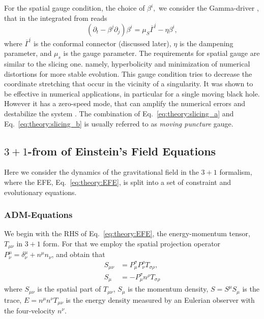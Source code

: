 For the spatial gauge condition, the choice of $\beta^i,$ we consider the Gamma-driver 
\citep{Alcubierre:2002kk,vanMeter:2006vi}, that in the integrated from reads 
%
\begin{equation}
    (\partial_t - \beta^j\partial_j)\beta^i = \mu_S\overline{\Gamma}^i - \eta\beta^i,
    \label{eq:theory:slicing_b}
\end{equation}
%
where $\overline{\Gamma}^i$ is the conformal connector (discussed later), $\eta$ is the 
dampening parameter, and $\mu_s$ is the gauge parameter.
The requirements for spatial gauge are similar to the slicing one. 
namely, hyperbolicity and minimization of numerical distortions for more stable evolution. 
This gauge condition tries to decrease the coordinate stretching that occur in the 
vicinity of a singularity. It was shown to be effective in numerical applications, 
in particular for a single moving black hole. However it has a zero-speed mode, 
that can amplify the numerical errors and destabilize the system \citep{vanMeter:2006vi}.
%
The combination of Eq.~\eqref{eq:theory:slicing_a} and Eq.~\eqref{eq:theory:slicing_b}
is usually referred to as \textit{moving puncture} gauge. 
%


\subsection{$3+1$-from of Einstein's Field Equations}

Here we consider the dynamics of the gravitational field in the $3+1$ formalism,
where the \ac{EFE}, Eq.~\eqref{eq:theory:EFE}, is split into a set of constraint and 
evolutionary equations.

\subsubsection{ADM-Equations}


We begin with the \ac{RHS} of Eq.~\eqref{eq:theory:EFE}, the energy-momentum tensor, 
$T_{\mu\nu}$ in $3+1$ form. For that we employ the spatial projection operator 
$P^{\mu}_{\nu} = \delta_{\nu}^{\mu} + n^{\mu}n_{\nu}$, and obtain that 
%
\begin{subequations}
    \begin{align}
    S_{\mu\nu} &= P^{\sigma}_{\mu} P^{\rho}_{\nu} T_{\sigma\rho}, \label{eq:theory:s_munu}\\
    S_{\mu} &= -P^{\sigma}_{\mu} n^{\rho} T_{\sigma\rho} \label{eq:theory:smu}
    \end{align}
\end{subequations}
%
where $S_{\mu\nu}$ is the spatial part of $T_{\mu\nu}$, $S_{\mu}$ is the momentum density, 
$S=S^{\mu}S_{\mu}$ is the trace, $E=n^{\mu}n^{\nu}T_{\mu\nu}$ is the energy density 
measured by an Eulerian observer with the four-velocity $n^{\nu}$.


